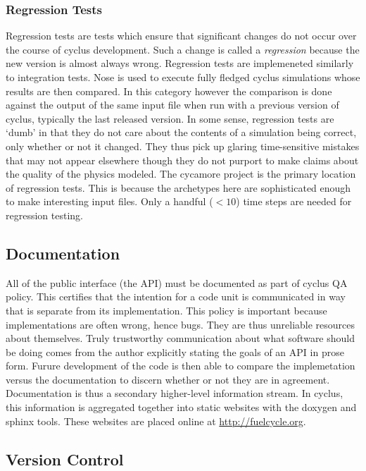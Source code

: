 \subsubsection{Regression Tests}

Regression tests are tests which ensure that significant changes do not 
occur over the course of cyclus development. Such a change is called a 
\emph{regression} because the new version is almost always wrong.
Regression tests are implemeneted similarly to integration tests.
Nose is used to execute fully fledged cyclus simulations whose results
are then compared. In this category however the comparison is done against 
the output of the same input file when run with a previous version of cyclus, 
typically the last released version.
In some sense, regression tests are `dumb' in that they do 
not care about the contents of a simulation being correct, only whether or not 
it changed. They thus pick up glaring time-sensitive mistakes that may 
not appear elsewhere though they do not purport to make claims about the
quality of the physics modeled. The cycamore project is the primary location of
regression tests. This is because the archetypes here are sophisticated enough
to make interesting input files. Only a handful ($<10$) time steps are needed 
for regression testing.

\subsection{Documentation}

All of the public interface (the API) must be documented as part of cyclus
QA policy. This certifies that the intention for a code unit is communicated 
in way that is separate from its implementation. This policy is important 
because implementations are often wrong, hence bugs. They are thus unreliable 
resources about themselves. Truly trustworthy communication about what 
software should be doing comes from the author explicitly stating the 
goals of an API in prose form. Furure development of the code is then able to 
compare the implemetation versus the documentation to discern whether or not they 
are in agreement. Documentation is thus a secondary higher-level information 
stream.  In cyclus, this information is aggregated together into static 
websites with the doxygen \cite{van_heesch_doxygen:_2008} and sphinx 
\cite{brandl_sphinx_2014} 
tools. These websites are placed online at \url{http://fuelcycle.org}.

\subsection{Version Control}

